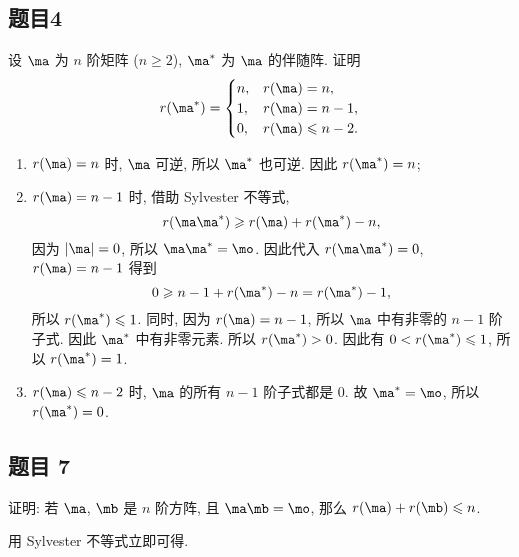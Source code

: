 \newpage
\subsection*{题目4}
\begin{problem*}
设 $\ma$ 为 $n$ 阶矩阵 ($n \geqslant 2$),  $\ma^{\ast}$ 为 $\ma$ 的伴随阵. 证明
\[
r(\ma^{\ast}) = 
\begin{cases}
    n, & r(\ma) = n, \\
    1, & r(\ma) = n - 1, \\
    0, & r(\ma) \leqslant n - 2.
\end{cases}
\]
\end{problem*}
\begin{solution}
\begin{enumerate}
    \item $r(\ma) = n$ 时, $\ma$ 可逆, 所以 $\ma^{\ast}$ 也可逆. 因此 $r(\ma^{\ast}) = n$;
    \item $r(\ma) = n - 1$ 时, 借助 Sylvester 不等式,
    \[
        r(\ma \ma^{\ast}) \geqslant r(\ma) + r(\ma^\ast) - n,
    \]
    因为 $|\ma| = 0$, 所以 $\ma \ma^{\ast} = \mo$. 因此代入 $r(\ma \ma^{\ast}) = 0$, $r(\ma) = n - 1$ 得到
    \[
        0 \geqslant n - 1 + r(\ma^\ast) - n = r(\ma^\ast) - 1,
    \]
    所以 $r(\ma^\ast) \leqslant 1$. 同时, 因为 $r(\ma) = n - 1$, 所以 $\ma$ 中有非零的 $n - 1$ 阶子式. 因此 $\ma^\ast$ 中有非零元素. 所以 $r(\ma^\ast) > 0$. 因此有 $0 < r(\ma^\ast) \leqslant 1$, 所以 $r(\ma^\ast) = 1$.
    \item $r(\ma) \leqslant n - 2$ 时, $\ma$ 的所有 $n - 1$ 阶子式都是 $0$. 故 $\ma^\ast = \mo$, 所以 $r(\ma^\ast) = 0$.
\end{enumerate}
\end{solution}

\subsection*{ 题目 7 }
\begin{problem*}
证明: 若 $\ma$, $\mb$ 是 $n$ 阶方阵, 且 $\ma \mb = \mo$, 那么 $r(\ma) + r(\mb) \leqslant n$.
\end{problem*}
\begin{solution}
用 Sylvester 不等式立即可得.
\end{solution}

\newpage
